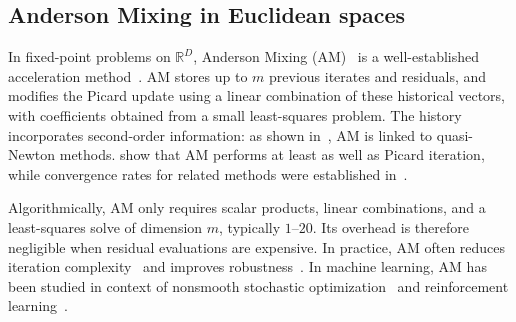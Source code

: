 \documentclass{article} %
\numberwithin{equation}{subsection}
\numberwithin{theorem}{section}
\begin{document}
    \subsection{Anderson Mixing in Euclidean spaces}
    In fixed-point problems on \(\mathbb{R}^D\), Anderson Mixing (AM)~\cite{anderson1965iterative} is a well-established acceleration method~\cite{walker2011anderson,tang2023accelerating}. 
AM stores up to \(m\) previous iterates and residuals, and modifies the Picard update using a linear combination of these historical vectors, with coefficients obtained from a small least-squares problem. 
The history incorporates second-order information: as shown in~\cite{fang2009two}, AM is linked to quasi-Newton methods. 
\cite{toth2015convergence,evans2020proof,rebholz2023effect} show that AM performs at least as well as Picard iteration, while convergence rates for related methods were established in~\cite{scieur2024adaptive}.

Algorithmically, AM only requires scalar products, linear combinations, and a least-squares solve of dimension \(m\), typically \(1\)--\(20\). 
Its overhead is therefore negligible when residual evaluations are expensive. 
In practice, AM often reduces iteration complexity~\cite{aksenov2021application,lott2012accelerated,lipnikov2013anderson,brezinski2022shanks,qu2026extra} and improves robustness~\cite{willert2014leveraging}. 
In machine learning, AM has been studied in context of nonsmooth stochastic optimization~\cite{wei2021stochastic} and reinforcement learning~\cite{sun2021damped}.
        
\end{document}
